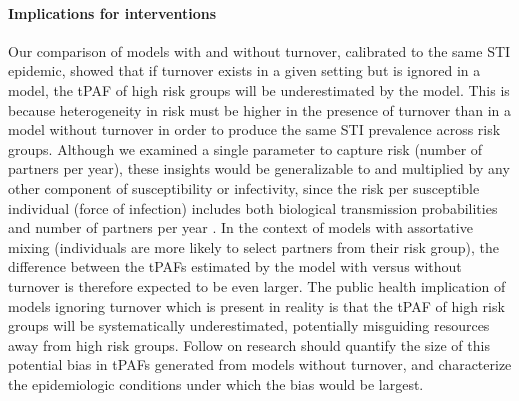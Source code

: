 \paragraph{Implications for interventions}
Our comparison of models with and without turnover,
calibrated to the same STI epidemic,
showed that if turnover exists in a given setting
but is ignored in a model,
the tPAF of high risk groups will be underestimated by the model.
This is because heterogeneity in risk
must be higher in the presence of turnover than in a model without turnover
in order to produce the same STI prevalence across risk groups.
Although we examined a single parameter to capture risk
(number of partners per year),
these insights would be generalizable to and multiplied by
any other component of susceptibility or infectivity,
since the risk per susceptible individual (force of infection) includes both
biological transmission probabilities and number of partners per year \citep{Anderson1991}.
In the context of models with assortative mixing
(individuals are more likely to select partners from their risk group),
the difference between the tPAFs estimated by the model
with versus without turnover is therefore expected to be even larger.
The public health implication of models ignoring turnover
which is present in reality is that
the tPAF of high risk groups will be systematically underestimated,
potentially misguiding resources away from high risk groups.
Follow on research should quantify the size of
this potential bias in tPAFs generated from models without turnover,
and characterize the epidemiologic conditions under which the bias would be largest.
